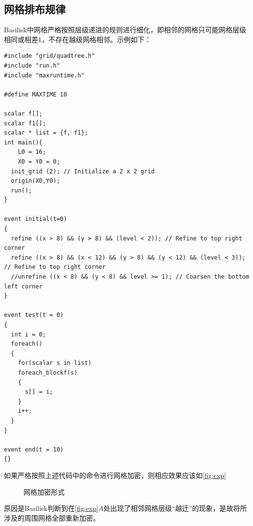 \documentclass[lang=cn,11pt,a4paper]{elegantpaper}
\begin{document}
\subsection{网格排布规律}
Basilisk中网格严格按照层级递进的规则进行细化，即相邻的网格只可能网格层级相同或相差1，不存在越级网格相邻。示例如下：
\begin{verbatim}
#include "grid/quadtree.h"
#include "run.h"
#include "maxruntime.h"

#define MAXTIME 10

scalar f[];
scalar f1[];
scalar * list = {f, f1};
int main(){
	L0 = 16;
	X0 = Y0 = 0;
  init_grid (2); // Initialize a 2 x 2 grid
  origin(X0,Y0);
  run();
}

event initial(t=0)
{
  refine ((x > 8) && (y > 8) && (level < 2)); // Refine to top right corner
  refine ((x > 8) && (x < 12) && (y > 8) && (y < 12) && (level < 3)); // Refine to top right corner
  //unrefine ((x < 8) && (y < 8) && level >= 1); // Coarsen the bottom left corner
}

event test(t = 0)
{
  int i = 0;
  foreach()
  {
    for(scalar s in list)
    foreach_blockf(s)
    {
      s[] = i;
    }
    i++;
  }
}

event end(t = 10)
{}
\end{verbatim}
如果严格按照上述代码中的命令进行网格加密，则相应效果应该如\ref{fig:exp}
\begin{figure}[H]
        \centering
    \caption{网格加密形式}
\end{figure}
原因是Basilisk判断到在\ref{fig:exp}$A$处出现了相邻网格层级“越迁”的现象，是故将所涉及的周围网格全部重新加密。
\end{document}

